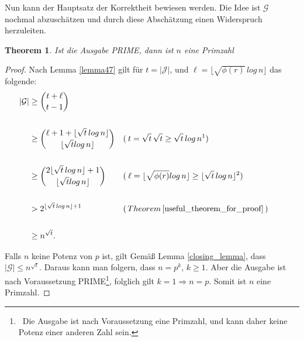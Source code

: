 \documentclass[12pt,oneside]{article}
\newtheorem{theorem}{Theorem}[section]
\theoremstyle{remark}
\theoremstyle{definition}
\begin{document}
Nun kann der Hauptsatz der Korrektheit bewiesen werden. Die Idee ist $\mathcal{G}$ nochmal abzuschätzen und durch diese Abschätzung einen Widerspruch herzuleiten.\newline

\begin{theorem}\label{rueck_rich}
Ist die Ausgabe PRIME, dann ist $n$ eine Primzahl 
\end{theorem}

\smallskip

\begin{proof}
Nach Lemma \ref{lemma47} gilt für $t = |\mathcal{J}|$, und $\ell = \lfloor \sqrt{\phi(r)} \, log \, n \rfloor$ das folgende:\newline\newline
\begin{align*}
|\mathcal{G}| & \geq {t + \ell \choose t - 1} \\
\\
& \geq {\ell + 1 + \lfloor \sqrt{t} \, log \, n \rfloor \choose \lfloor \sqrt{t} log \, n \rfloor} && ( \: t = \sqrt{t} \,
\sqrt{t} \geq \sqrt{t} \,  log \, n\text{\footnotemark}) && \\
\\
& \geq {2 \lfloor \sqrt{t} \, log \,  n \rfloor + 1 \choose \lfloor \sqrt{t} log \, n \rfloor} && ( \: \ell = \lfloor \sqrt{\phi(r)} log \, n \rfloor \geq \lfloor \sqrt{t} \, log \, n \rfloor\text{\footnotemark})\\
\\
&> 2^{\lfloor \sqrt{t} \, log \, n \rfloor + 1} &&(\,  Theorem \,  \ref{useful_theorem_for_proof} \, )\\
\\
&\geq n^{\sqrt{t}}.
\end{align*}

\addtocounter{footnote}{-1}


Falls $n$ keine Potenz von $p$ ist, gilt Gemäß Lemma \ref{closing_lemma}, dass $|\mathcal{G}| \leq n^{\sqrt{t}}$. Daraus kann man folgern, dass $n = p^k$, $k \geq 1$. Aber die Ausgabe ist nach Voraussetzung PRIME\footnote{ $\,$ Die Ausgabe ist nach Voraussetzung eine Primzahl, und kann daher keine Potenz einer anderen Zahl sein.}, folglich gilt $ k= 1 \Rightarrow n = p$. Somit ist $n$ eine Primzahl.
\end{proof}
\end{document}
